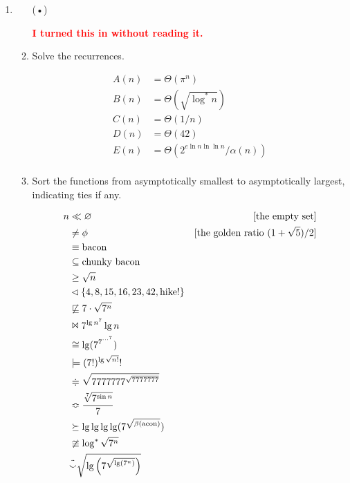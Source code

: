 \documentclass[11pt]{article}
\begin{document}

\small\sf	%

\begin{enumerate}
\item
\begin{enumerate}\itemsep 2ex plus 0.1fil
\item[(•)]
\textcolor{red}{}

\begin{solution}
\textcolor{red}{\textbf{I turned this in without reading it.}}
\end{solution}

\item
Solve the recurrences.

\begin{solution}
\begin{align*}
	A(n) &= \Theta(\pi^n) \\
	B(n) &= \Theta(\sqrt{\log^* n}) \\
	C(n) &= \Theta(1/n) \\
	D(n) &= \Theta(42) \\
	E(n) &= \Theta(2^{e\ln n \ln \ln n}/\alpha(n)) \\
\end{align*}
\end{solution}

\item
Sort the functions from asymptotically smallest to asymptotically largest, indicating ties if any.

\begin{solution}
\begin{align*}
		n
	& \ll
		\varnothing  & \text{[the empty set]} \\
	& \ne
		\phi  & \text{[the golden ratio $(1+\sqrt{5})/2$]}\\
	& \equiv
		\text{bacon} \\
	& \subseteq 
		\text{chunky bacon} \\
	& \ge
		\sqrt{n} \\
	& \lhd
		\{ 4, 8, 15, 16, 23, 42, \text{hike!} \} \\
	& \not\sqsubseteq
		7\cdot\sqrt{7^n} \\
	& \Join
		7^{\lg n^7}\lg n \\
	& \cong
		\lg( 7^{7^{\cdots^7}}) \\
	& \models
		(7!)^{\lg \sqrt{n!}}! \\
	& \doteqdot
		\sqrt{7777777^{\sqrt{7777777}}} \\
	& \Bumpeq
		\frac{\sqrt[7]{7^{\sin n}}}{7} \\
	& \succeq
		\lg\lg\lg\lg (7^{\sqrt{\beta(\text{acon})}}) \\
	& \ncong
		\log^* \sqrt{7^n} \\
	& \ddot{\smallsmile}
		\sqrt{\lg \left(7^{\sqrt{\lg (7^n)}}\right)}
	\end{align*}
\end{solution}


\end{enumerate}
\end{enumerate}
\end{document}

